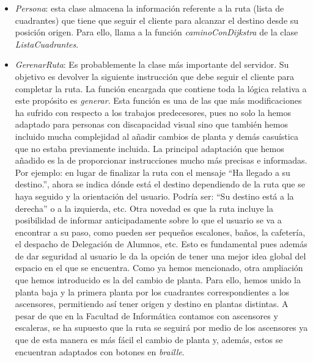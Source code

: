 \begin{itemize}
	\item \textit{Persona}: esta clase almacena la información referente a la ruta (lista de cuadrantes) que tiene que seguir el cliente para alcanzar el destino desde su posición origen. Para ello, llama a la función \textit{caminoConDijkstra} de la clase \textit{ListaCuadrantes}.
	
	\item \textit{GerenarRuta}: Es probablemente la clase más importante del servidor. Su objetivo es devolver la siguiente instrucción que debe seguir el cliente para completar la ruta. La función encargada que contiene toda la lógica relativa a este propósito es \textit{generar}. Esta función es una de las que más modificaciones ha sufrido con respecto a los trabajos predecesores, pues no solo la hemos adaptado para personas con discapacidad visual sino que también hemos incluido mucha complejidad al añadir cambios de planta y demás casuística que no estaba previamente incluida. La principal adaptación que hemos añadido es la de proporcionar instrucciones mucho más precisas e informadas. Por ejemplo: en lugar de finalizar la ruta con el mensaje ``Ha llegado a su destino.'', ahora se indica dónde está el destino dependiendo de la ruta que se haya seguido y la orientación del usuario. Podría ser: ``Su destino está a la derecha'' o a la izquierda, etc. Otra novedad es que la ruta incluye la posibilidad de informar anticipadamente sobre lo que el usuario se va a encontrar a su paso, como pueden ser pequeños escalones, baños, la cafetería, el despacho de Delegación de Alumnos, etc. Esto es fundamental pues además de dar seguridad al usuario le da la opción de tener una mejor idea global del espacio en el que se encuentra. Como ya hemos mencionado, otra ampliación que hemos introducido es la del cambio de planta. Para ello, hemos unido la planta baja y la primera planta por los cuadrantes correspondientes a los ascensores, permitiendo así tener origen y destino en plantas distintas. A pesar de que en la Facultad de Informática contamos con ascensores y escaleras, se ha supuesto que la ruta se seguirá por medio de los ascensores ya que de esta manera es más fácil el cambio de planta y, además, estos se encuentran adaptados con botones en \textit{braille}.
	
\end{itemize}


